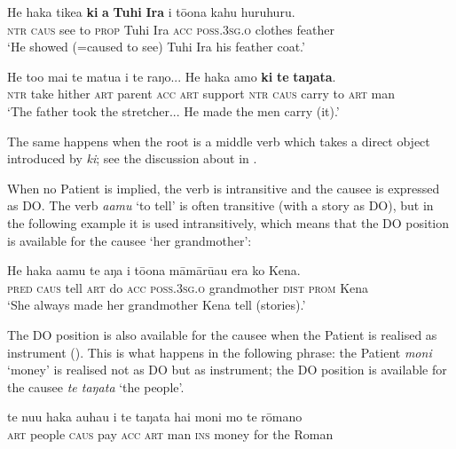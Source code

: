 \ea\label{ex:8.234}
\gll He haka tike{\ꞌ}a \textbf{ki} \textbf{a} \textbf{Tuhi} \textbf{Ira} i tō{\ꞌ}ona kahu huruhuru. \\
\textsc{ntr} \textsc{caus} see to \textsc{prop} Tuhi Ira \textsc{acc} \textsc{poss.3sg.o} clothes feather \\

\glt 
‘He showed (=caused to see) Tuhi Ira his feather coat.’ \textstyleExampleref{[Fel-33-011]}
\z

\ea\label{ex:8.235}
\gll He to{\ꞌ}o mai te matu{\ꞌ}a i te raŋo... He haka {\ꞌ}amo \textbf{ki} \textbf{te} \textbf{taŋata}.\\
\textsc{ntr} take hither \textsc{art} parent \textsc{acc} \textsc{art} support \textsc{ntr} \textsc{caus} carry to \textsc{art} man\\

\glt
‘The father took the stretcher... He made the men carry (it).’ \textstyleExampleref{[Mtx-7-13.044]}
\z

The same happens when the root is a middle verb which takes a direct object introduced by \textit{ki}; see the discussion about  in .

When no Patient is implied, the verb is intransitive and the causee is expressed as DO. The verb \textit{{\ꞌ}a{\ꞌ}amu} ‘to tell’ is often transitive (with a story as DO), but in the following example it is used intransitively, which means that the DO position is available for the causee ‘her grandmother’:

\ea\label{ex:8.236}
\gll He haka {\ꞌ}a{\ꞌ}amu te aŋa i tō{\ꞌ}ona māmārū{\ꞌ}au era ko Kena. \\
\textsc{pred} \textsc{caus} tell \textsc{art} do \textsc{acc} \textsc{poss.3sg.o} grandmother \textsc{dist} \textsc{prom} Kena \\

\glt
‘She always made her grandmother Kena tell (stories).’ \textstyleExampleref{[R380.015]} 
\z

The DO position is also available for the causee when the Patient is realised as instrument (). This is what happens in the following phrase: the Patient \textit{moni} ‘money’ is realised not as DO but as instrument; the DO position is available for the causee \textit{te taŋata} ‘the people’.

\ea\label{ex:8.237}
\gll te nu{\ꞌ}u haka {\ꞌ}auhau i te taŋata hai moni mo te rōmano\\
\textsc{art} people \textsc{caus} pay \textsc{acc} \textsc{art} man \textsc{ins} money for the Roman\\

